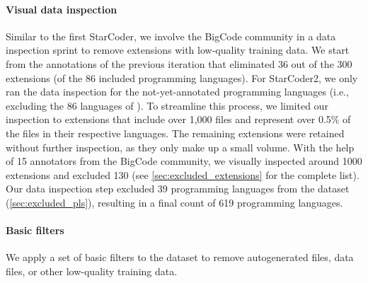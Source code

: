 \documentclass[10pt]{article} %
\begin{document}
\paragraph{Visual data inspection} Similar to the first StarCoder, we involve the BigCode community in a data inspection sprint to remove extensions with low-quality training data. We start from the annotations of the previous iteration that eliminated 36 out of the 300 extensions (of the 86 included programming languages). For StarCoder2, we only ran the data inspection for the not-yet-annotated programming languages (i.e., excluding the 86 languages of \starcoderbase{}). To streamline this process, we limited our inspection to extensions that include over 1,000 files and represent over 0.5\% of the files in their respective languages. The remaining extensions were retained without further inspection, as they only make up a small volume. With the help of 15 annotators from the BigCode community, we visually inspected around 1000 extensions and excluded 130 (see \cref{sec:excluded_extensions} for the complete list). Our data inspection step excluded 39 programming languages from the dataset (\cref{sec:excluded_pls}), resulting in a final count of 619 programming languages. 





\paragraph{Basic filters} We apply a set of basic filters to the dataset to remove autogenerated files, data files, or other low-quality training data. 
\end{document}
